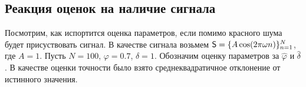 \documentclass[specialist,
substylefile = spbu_report.rtx,
subf,href,colorlinks=true, 12pt]{disser}
\theoremstyle{definition}
\begin{document}




\subsection{Реакция оценок на наличие сигнала}
Посмотрим, как испортится оценка параметров, если помимо красного шума будет присуствовать сигнал. В качестве сигнала возьмем $\mathsf{S}=\{A\cos(2\pi\omega n)\}_{n=1}^N$, где $A=1$. Пусть $N=100$, $\varphi=0.7$, $\delta=1$. Обозначим оценку параметров за $\hat\varphi$ и $\hat \delta$. В качестве оценки точности было взято среднеквадратичное отклонение от истинного значения. 
\end{document}
